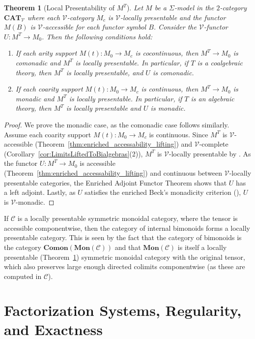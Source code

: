 \documentclass[11pt]{article}
\theoremstyle{plain}
\newtheorem{theorem}{Theorem}[section]
\theoremstyle{definition}
\numberwithin{equation}{section}
\newcommand{\C}{\mathcal{C}}
\newcommand{\CAT}{\mathbf{CAT}}
\newcommand{\V}{\mathcal{V}}
\newcommand{\Mon}{\mathbf{Mon}}
\begin{document}
\begin{theorem}[Local Presentability of $M^T$]\label{thm:LiftingLP}
   Let $M$ be a $\Sigma$-model in the $2$-category $\CAT_{\V}$ where each $\V$-category $M_c$ is $\V$-locally presentable and the functor $M(B)$ is $\V$-accessible for each functor symbol $B$. Consider the $\V$-functor $U\colon M^T\to M_0$. Then the following conditions hold:
   \begin{enumerate}
       \item If each arity support $M(t) \colon M_0 \to M_c$ is cocontinuous, then $M^T\to M_0$ is comonadic and $M^T$ is locally presentable. In particular, if $T$ is a coalgebraic theory, then $M^T$ is locally presentable, and $U$ is comonadic.
       \item If each coarity support $M(t) \colon M_0 \to M_c$ is continuous, then $M^T\to M_0$ is monadic and $M^T$ is locally presentable. In particular, if $T$ is an algebraic theory, then $M^T$ is locally presentable and $U$ is monadic.
   \end{enumerate}
\end{theorem}
\begin{proof}
   We prove the monadic case, as the comonadic case follows similarly. Assume each coarity support $M(t) \colon M_0 \to M_c$ is continuous. Since $M^T$ is $\V$-accessible (Theorem~\ref{thm:enriched_accessability_lifting}) and $\V$-complete (Corollary~\ref{cor:LimitsLiftedToBialgebras}(2)), $M^T$ is $\V$-locally presentable by \cite[Corollary 3.21.]{LACK2023107196}. As the functor $U\colon M^T\to M_0$ is accessible (Theorem~\ref{thm:enriched_accessability_lifting}) and continuous between $\V$-locally presentable categories, the Enriched Adjoint Functor Theorem \cite[Theorem 5.32]{Kelly:Enriched} shows that $U$ has a left adjoint. Lastly, as $U$ satisfies the enriched Beck's monadicity criterion (\cite[Theorem II.2.1]{dubuc1970}), $U$ is $\V$-monadic. 
\end{proof}

If $\C$ is a locally presentable symmetric monoidal category, where the tensor is accessible componentwise, then the category of internal bimonoids forms a locally presentable category. This is seen by the fact that the category of bimonoids is the category $\textbf{Comon}(\Mon(\C))$ and that $\Mon(\C)$ is itself a locally presentable (Theorem~\ref{thm:LiftingLP}) symmetric monoidal category with the original tensor, which also preserves large enough directed colimits componentwise (as these are computed in $\C$).

\section{Factorization Systems, Regularity, and Exactness}
\end{document}
